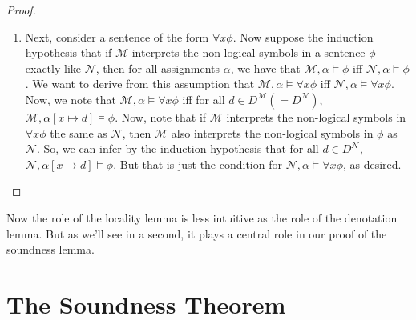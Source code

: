 \begin{enumerate}[\thesection.1]
\begin{proof}
\begin{enumerate}
                  \item Next, consider a sentence of the form $\forall
                    x\phi$. Now suppose the induction hypothesis that
                    if $\mathcal{M}$ interprets the non-logical
                    symbols in a sentence $\phi$ exactly like $\mathcal{N}$, then
                    for all assignments $\alpha$, we have that
                    $\mathcal{M},\alpha\vDash\phi$ iff
                    $\mathcal{N},\alpha\vDash\phi$. We want to derive
                    from this assumption that
                    $\mathcal{M},\alpha\vDash\forall x\phi$ iff
                    $\mathcal{N},\alpha\vDash\forall x\phi$. Now, we
                    note that $\mathcal{M},\alpha\vDash\forall x\phi$
                    iff for all $d\in D^\mathcal{M}(=D^\mathcal{N})$,
                    $\mathcal{M},\alpha[x\mapsto d]\vDash\phi$. Now,
                    note that if $\mathcal{M}$ interprets the
                    non-logical symbols in $\forall x\phi$ the same as
                    $\mathcal{N}$, then $\mathcal{M}$ also interprets
                    the non-logical symbols in $\phi$ as
                    $\mathcal{N}$. So, we can infer by the induction
                    hypothesis that for all $d\in D^\mathcal{N}$,
                    $\mathcal{N},\alpha[x\mapsto d]\vDash\phi$. But
                    that is just the condition for
                    $\mathcal{N},\alpha\vDash\forall x\phi$, as desired.

                \end{enumerate}
            \end{proof}
            Now the role of the locality lemma is less intuitive as
            the role of the denotation lemma. But as we'll see in a
            second, it plays a central role in our proof of the
            soundness lemma.
		
	\end{enumerate}

\section{The Soundness Theorem}

